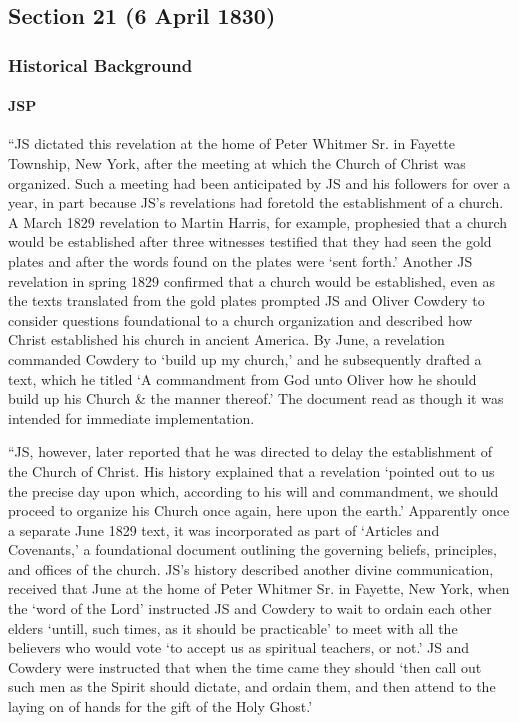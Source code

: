 \subsection{Section 21 (6 April 1830)}
	\label{DC21}
	
	\subsubsection{Historical Background}
		\label{DC21-HB}
		
		\paragraph{JSP}
			\label{DC21-HB-JSP}
		
			``JS dictated this revelation at the home of Peter Whitmer Sr. in Fayette Township, New York, after the meeting at which the Church of Christ was organized. Such a meeting had been anticipated by JS and his followers for over a year, in part because JS's revelations had foretold the establishment of a church. A March 1829 revelation to Martin Harris, for example, prophesied that a church would be established after three witnesses testified that they had seen the gold plates and after the words found on the plates were `sent forth.' Another JS revelation in spring 1829 confirmed that a church would be established, even as the texts translated from the gold plates prompted JS and Oliver Cowdery to consider questions foundational to a church organization and described how Christ established his church in ancient America. By June, a revelation commanded Cowdery to `build up my church,' and he subsequently drafted a text, which he titled `A commandment from God unto Oliver how he should build up his Church \& the manner thereof.' The document read as though it was intended for immediate implementation.

			``JS, however, later reported that he was directed to delay the establishment of the Church of Christ. His history explained that a revelation `pointed out to us the precise day upon which, according to his will and commandment, we should proceed to organize his Church once again, here upon the earth.' Apparently once a separate June 1829 text, it was incorporated as part of `Articles and Covenants,' a foundational document outlining the governing beliefs, principles, and offices of the church. JS's history described another divine communication, received that June at the home of Peter Whitmer Sr. in Fayette, New York, when the `word of the Lord' instructed JS and Cowdery to wait to ordain each other elders `untill, such times, as it should be practicable' to meet with all the believers who would vote `to accept us as spiritual teachers, or not.' JS and Cowdery were instructed that when the time came they should `then call out such men as the Spirit should dictate, and ordain them, and then attend to the laying on of hands for the gift of the Holy Ghost.'

